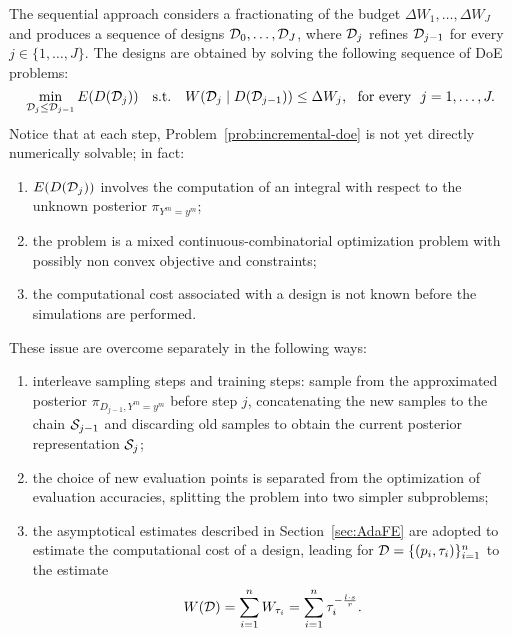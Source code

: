 The sequential approach considers a fractionating of the budget $\Delta W_1, \dots, \Delta W_J$ and produces a sequence of designs $\mathcal D_0,\dots, \mathcal D_J$, where $\mathcal D_j$ refines $\mathcal D_{j-1}$ for every $j \in \{1,\dots, J\}$.
The designs are obtained by solving the following sequence of DoE problems:
\begin{equation} \label{prob:incremental-doe}
    \min_{\mathcal D_{j} \le \mathcal D_{j-1}} E(D(\mathcal D_{j})) \quad \text{s.t.} 
    \quad W(\mathcal D_{j} \mid D(\mathcal D_{j-1}) ) \le \Delta W_j, \ \text{ for every } \ j=1,\dots,J.
\end{equation} 
Notice that at each step, Problem~\eqref{prob:incremental-doe} is not yet directly numerically solvable; in fact:
\begin{enumerate}[label=\textbf{\arabic*}]    
    \item $E(D(\mathcal D_{j}))$ involves the computation of an integral with respect to the unknown posterior $\pi_{Y^m = y^m}$;
    \item the problem is a mixed continuous-combinatorial optimization problem with possibly non convex objective and constraints;
    \item the computational cost associated with a design is not known before the simulations are performed.
\end{enumerate}
These issue are overcome separately in the following ways:
\begin{enumerate}[label=\textbf{\arabic*}]
    \item interleave sampling steps and training steps: sample from the approximated posterior $\pi_{D_{j-1}, Y^m = y^m}$ before step $j$, concatenating the new samples to the chain $\mathcal S_{j-1}$ and discarding old samples to obtain the current posterior representation $\mathcal S_j$;
    \item the choice of new evaluation points is separated from the optimization of evaluation accuracies, splitting the problem into two simpler subproblems;
    \item the asymptotical estimates described in Section~\ref{sec:AdaFE} are adopted to estimate the computational cost of a design, leading for $\mathcal D = \{ (p_i, \tau_i) \}_{i=1}^n$ to the estimate
    \begin{equation} \label{eq:comp-cost}
        W(\mathcal D) = \sum_{i=1}^n W_{\tau_i} = \sum_{i=1}^n \tau_i^{- \frac{l \cdot  s}{r}}.
    \end{equation}
\end{enumerate}

